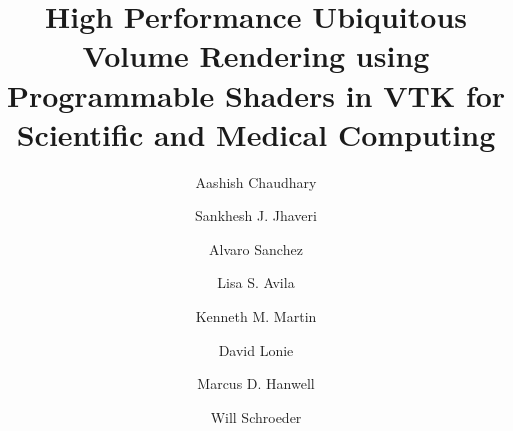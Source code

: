 \title{High Performance Ubiquitous Volume Rendering using Programmable Shaders in VTK for Scientific and Medical Computing}

\author{Aashish Chaudhary}

\author{Sankhesh J. Jhaveri}

\author{Alvaro Sanchez\corref{}}

\author{Lisa S. Avila}

\author{Kenneth M. Martin}

\author{David Lonie}

\author{Marcus D. Hanwell}

\author{Will Schroeder}

\address{Kitware, Inc., 28 Corporate Drive, Clifton Park, NY 12065, USA}
